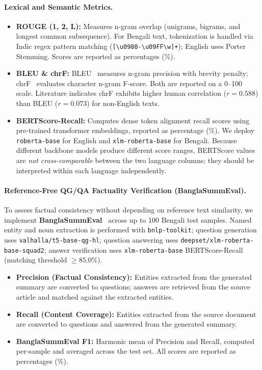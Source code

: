 \documentclass[runningheads]{llncs}
\begin{document}
\paragraph{Lexical and Semantic Metrics.}
\begin{itemize}
    \item \textbf{ROUGE (1, 2, L):} Measures n-gram overlap (unigrams, bigrams, and longest common subsequence). For Bengali text, tokenization is handled via Indic regex pattern matching (\texttt{[\textbackslash u0980-\textbackslash u09FF\textbackslash w]+}); English uses Porter Stemming. Scores are reported as percentages (\%).
    \item \textbf{BLEU \& chrF:} BLEU~\cite{papineni2002} measures n-gram precision with brevity penalty; chrF~\cite{popovic2015} evaluates character n-gram F-score. Both are reported on a 0--100 scale. Literature indicates chrF exhibits higher human correlation ($r = 0.588$) than BLEU ($r = 0.073$) for non-English texts.
    \item \textbf{BERTScore-Recall:} Computes dense token alignment recall scores using pre-trained transformer embeddings, reported as percentage (\%). We deploy \texttt{roberta-base} for English and \texttt{xlm-roberta-base} for Bengali. Because different backbone models produce different score ranges, BERTScore values are \emph{not cross-comparable} between the two language columns; they should be interpreted within each language independently.
\end{itemize}

\paragraph{Reference-Free QG/QA Factuality Verification (BanglaSummEval).}
To assess factual consistency without depending on reference text similarity, we implement \textbf{BanglaSummEval}~\cite{rafid2026} across up to 100 Bengali test samples. Named entity and noun extraction is performed with \texttt{bnlp-toolkit}; question generation uses \texttt{valhalla/t5-base-qg-hl}; question answering uses \texttt{deepset/xlm-roberta-base-squad2}; answer verification uses \texttt{xlm-roberta-base} BERTScore-Recall (matching threshold $\ge 85.0\%$).
\begin{itemize}
    \item \textbf{Precision (Factual Consistency):} Entities extracted from the generated summary are converted to questions; answers are retrieved from the source article and matched against the extracted entities.
    \item \textbf{Recall (Content Coverage):} Entities extracted from the source document are converted to questions and answered from the generated summary.
    \item \textbf{BanglaSummEval F1:} Harmonic mean of Precision and Recall, computed per-sample and averaged across the test set. All scores are reported as percentages (\%).
\end{itemize}
\end{document}
